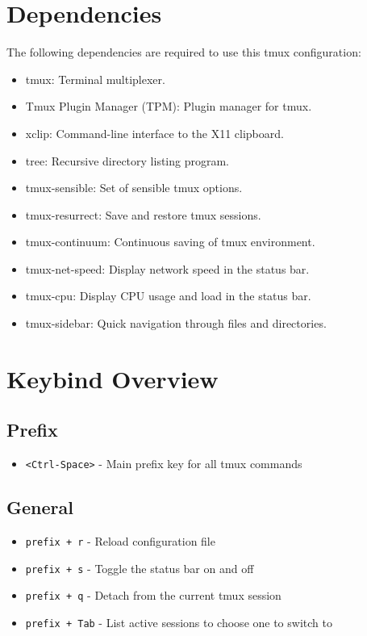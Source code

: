\documentclass{article}
\begin{document}
\section{Dependencies}
The following dependencies are required to use this tmux configuration:
\begin{itemize}
  \item tmux: Terminal multiplexer.
  \item Tmux Plugin Manager (TPM): Plugin manager for tmux.
  \item xclip: Command-line interface to the X11 clipboard.
  \item tree: Recursive directory listing program.
  \item tmux-sensible: Set of sensible tmux options.
  \item tmux-resurrect: Save and restore tmux sessions.
  \item tmux-continuum: Continuous saving of tmux environment.
  \item tmux-net-speed: Display network speed in the status bar.
  \item tmux-cpu: Display CPU usage and load in the status bar.
  \item tmux-sidebar: Quick navigation through files and directories.
\end{itemize}

\section{Keybind Overview}
\subsection{Prefix}
\begin{itemize}
  \item \texttt{<Ctrl-Space>} - Main prefix key for all tmux commands
\end{itemize}

\subsection{General}
\begin{itemize}
  \item \texttt{prefix + r} - Reload configuration file
  \item \texttt{prefix + s} - Toggle the status bar on and off
  \item \texttt{prefix + q} - Detach from the current tmux session
  \item \texttt{prefix + Tab} - List active sessions to choose one to switch to
\end{itemize}
\end{document}
